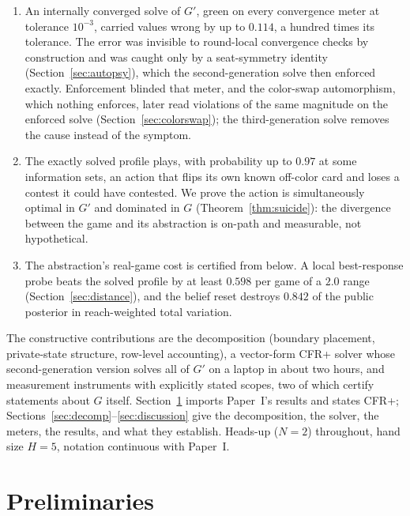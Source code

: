 \documentclass[11pt]{article}
\theoremstyle{plain}
\theoremstyle{definition}
\theoremstyle{remark}
\newcommand{\game}{\ensuremath{G}}
\newcommand{\gp}{\ensuremath{G'}}
\begin{document}
\begin{enumerate}\itemsep3pt
  \item An internally converged solve of $\gp$, green on every
        convergence meter at tolerance $10^{-3}$, carried values wrong
        by up to $0.114$, a hundred times its tolerance. The error was
        invisible to round-local convergence checks by construction and
        was caught only by a seat-symmetry identity
        (Section~\ref{sec:autopsy}), which the second-generation solve
        then enforced exactly. Enforcement blinded that meter, and the
        color-swap automorphism, which nothing enforces, later read
        violations of the same magnitude on the enforced solve
        (Section~\ref{sec:colorswap}); the third-generation solve
        removes the cause instead of the symptom.
  \item The exactly solved profile plays, with probability up to $0.97$
        at some information sets, an action that flips its own known
        off-color card and loses a contest it could have contested. We
        prove the action is simultaneously optimal in $\gp$ and
        dominated in $\game$ (Theorem~\ref{thm:suicide}): the
        divergence between the game and its abstraction is on-path and
        measurable, not hypothetical.
  \item The abstraction's real-game cost is certified from below. A
        local best-response probe beats the solved profile by at least
        $0.598$ per game of a $2.0$ range
        (Section~\ref{sec:distance}), and the belief reset destroys
        $0.842$ of the public posterior in reach-weighted total
        variation.
\end{enumerate}

The constructive contributions are the decomposition (boundary placement,
private-state structure, row-level accounting), a vector-form CFR+ solver whose
second-generation version solves all of $\gp$ on a laptop in about two hours,
and measurement instruments with explicitly stated scopes, two of which certify
statements about $\game$ itself. Section~\ref{sec:prelim} imports Paper~I's
results and states CFR+; Sections~\ref{sec:decomp}--\ref{sec:discussion} give
the decomposition, the solver, the meters, the results, and what they establish.
Heads-up ($N=2$) throughout, hand size $H=5$, notation continuous with Paper~I.

\section{Preliminaries}\label{sec:prelim}
\end{document}
